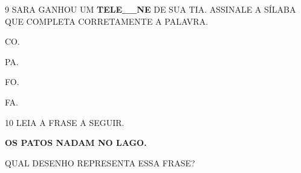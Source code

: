 \num{9} SARA GANHOU UM \textbf{TELE\_\_NE} DE SUA TIA. ASSINALE A SÍLABA QUE COMPLETA CORRETAMENTE A PALAVRA.

\begin{multicols}{2}
\begin{escolha}
\item CO.

\item PA.

\item FO.

\item FA.
\end{escolha}
\end{multicols}

\num{10} LEIA A FRASE A SEGUIR.

\begin{myquote}
\centering\large\textbf{OS PATOS NADAM NO LAGO.}
\end{myquote}

QUAL DESENHO REPRESENTA ESSA FRASE?

